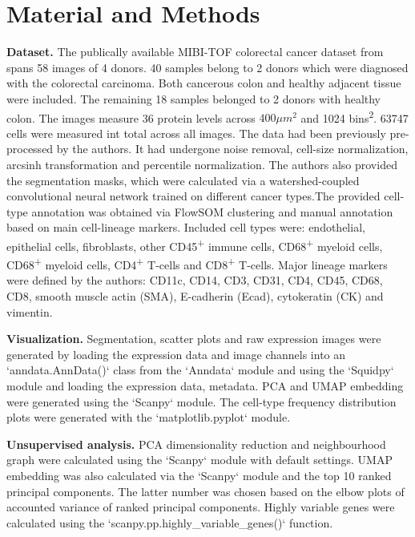 \chapter{Material and Methods}


\textbf{Dataset.} The publically available MIBI-TOF colorectal cancer dataset from \cite{Hartmann-2021} spans 58 images of 4 donors. 40 samples belong to 2 donors which were diagnosed with the colorectal carcinoma. Both cancerous colon and healthy adjacent tissue were included. The remaining 18 samples belonged to 2 donors with healthy colon. The images measure 36 protein levels across $400 \mu m^2$ and 1024 bins\textsuperscript{2}. 63747 cells were measured int total across all images. The data had been previously pre-processed by the authors. It had undergone noise removal, cell-size normalization, arcsinh transformation and percentile normalization. The authors also provided the segmentation masks, which were calculated via a watershed-coupled convolutional neural network trained on different cancer types.The provided cell-type annotation was obtained via FlowSOM clustering and manual annotation based on main cell-lineage markers. Included cell types were: endothelial, epithelial cells, fibroblasts, other CD45\textsuperscript{+} immune cells, CD68\textsuperscript{+} myeloid cells, CD68\textsuperscript{+} myeloid cells, CD4\textsuperscript{+} T-cells and CD8\textsuperscript{+} T-cells. Major lineage markers were defined by the authors: CD11c, CD14, CD3, CD31, CD4, CD45, CD68, CD8, smooth muscle actin (SMA), E-cadherin (Ecad), cytokeratin (CK) and vimentin.

\textbf{Visualization.} Segmentation, scatter plots and raw expression images were generated by loading the expression data and image channels into an `anndata.AnnData()` class from the `Anndata` module and using the `Squidpy` module and loading the expression data, metadata. PCA and UMAP embedding were generated using the `Scanpy` module. The cell-type frequency distribution plots were generated with the `matplotlib.pyplot` module.

\textbf{Unsupervised analysis.} PCA dimensionality reduction and neighbourhood graph were calculated using the `Scanpy` module with default settings. UMAP embedding was also calculated via the `Scanpy` module and the top 10 ranked  principal components. The latter number was chosen based on the elbow plots of accounted variance of ranked principal components. Highly variable genes were calculated using the `scanpy.pp.highly\_variable\_genes()` function.

